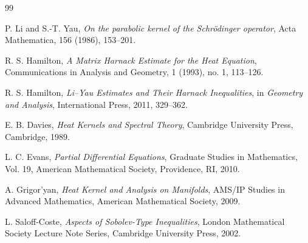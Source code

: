 \documentclass[11pt]{amsart}
\theoremstyle{definition}
\theoremstyle{remark}
\begin{document}
\begin{thebibliography}{99}



P. Li and S.-T. Yau,
\textit{On the parabolic kernel of the Schrödinger operator},
Acta Mathematica, 156 (1986), 153--201.




R. S. Hamilton,
\textit{A Matrix Harnack Estimate for the Heat Equation},
Communications in Analysis and Geometry, 1 (1993), no. 1, 113--126.




R. S. Hamilton,
\textit{Li--Yau Estimates and Their Harnack Inequalities},
in \textit{Geometry and Analysis},
International Press, 2011, 329--362.




E. B. Davies,
\textit{Heat Kernels and Spectral Theory},
Cambridge University Press, Cambridge, 1989.




L. C. Evans,
\textit{Partial Differential Equations},
Graduate Studies in Mathematics, Vol. 19,
American Mathematical Society, Providence, RI, 2010.




A. Grigor'yan,
\textit{Heat Kernel and Analysis on Manifolds},
AMS/IP Studies in Advanced Mathematics,
American Mathematical Society, 2009.




L. Saloff-Coste,
\textit{Aspects of Sobolev-Type Inequalities},
London Mathematical Society Lecture Note Series,
Cambridge University Press, 2002.



\end{thebibliography}
\end{document}
